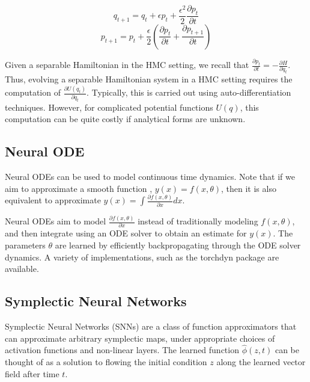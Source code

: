 \documentclass{article}
\theoremstyle{plain}
\theoremstyle{definition}
\theoremstyle{remark}
\begin{document}
$$ q_{t+1} = q_t + \epsilon p_t + \frac{\epsilon^2}{2}\frac{\partial p_t}{\partial t}$$
$$ p_{t+1} = p_t + \frac{\epsilon}{2}\left(\frac{\partial p_t}{\partial t} + \frac{\partial p_{t+1}}{\partial t}\right) $$

Given a separable Hamiltonian in the HMC setting, we recall that $\frac{\partial p_t}{\partial t} = - \frac{\partial H}{\partial q_t}$. Thus, evolving a separable Hamiltonian system in a HMC setting requires the computation of $\frac{\partial U(q_t)}{\partial q_t}$. Typically, this is carried out using auto-differentiation techniques. However, for complicated potential functions $U(q)$, this computation can be quite costly \cite{Li_2019} if analytical forms are unknown. 

\subsection{Neural ODE}
Neural ODEs \cite{chen2019neural} can be used to model continuous time dynamics. Note that if we aim to approximate a smooth function , $y(x) = f(x,\theta)$, then it is also equivalent to approximate $y(x) = \int \frac{\partial f(x,\theta)}{\partial x} dx $. 

Neural ODEs aim to model $\frac{\partial f(x,\theta)}{\partial x}$ instead of traditionally modeling $f(x, \theta)$, and then integrate using an ODE solver to obtain an estimate for $y(x)$. The parameters $\theta$ are learned by efficiently backpropagating through the ODE solver dynamics. A variety of implementations, such as the torchdyn package \cite{poli2020torchdyn} are available.

\subsection{Symplectic Neural Networks}
Symplectic Neural Networks (SNNs) \cite{jin2020sympnets}
are a class of function approximators that can approximate arbitrary symplectic maps, under appropriate choices of activation functions and non-linear layers. The learned function $\hat{\phi}(z,t)$ can be thought of as a solution to flowing the initial condition $z$ along the learned vector field after time $t$. 



\end{document}
